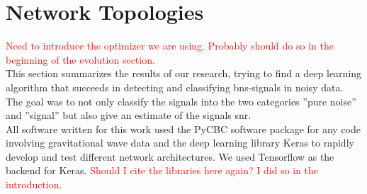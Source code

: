 \section{Network Topologies}\label{sec:network_topologies}
\textcolor{red}{Need to introduce the optimizer we are using. Probably should do so in the beginning of the evolution section.}\\
This section summarizes the results of our research, trying to find a deep learning algorithm that succeeds in detecting and classifying \gls{bns}-signals in noisy data. The goal was to not only classify the signals into the two categories ''pure noise'' and ''signal'' but also give an estimate of the signals \gls{snr}.\\
All software written for this work used the PyCBC software package \cite{pycbc} for any code involving gravitational wave data and the deep learning library Keras \cite{keras} to rapidly develop and test different network architectures. We used Tensorflow \cite{tensorflow} as the backend for Keras. \textcolor{red}{Should I cite the libraries here again? I did so in the introduction.}

